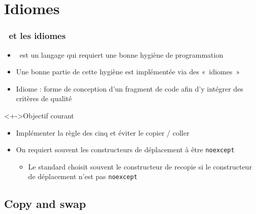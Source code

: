 \section{Idiomes}

\begin{frame}
\frametitle{\cpp\ et les idiomes}
\begin{itemize}[<+->]
\item \cpp\ est un langage qui requiert une bonne hygiène de programmation
\item Une bonne partie de cette hygiène est implémentée via des «~idiomes~»
\item Idiome : forme de conception d'un fragment de code afin d'y intégrer des critères de qualité
\end{itemize}
\begin{exampleblock}<+->{Objectif courant}
	\begin{itemize}[<+->]
	\item Implémenter la règle des cinq et éviter le copier / coller
	\end{itemize}
\end{exampleblock}
\begin{itemize}[<+->]
\item On requiert souvent les constructeurs de déplacement à être \lstinline|noexcept|
	\begin{itemize}
	\item Le standard choisit souvent le constructeur de recopie si le constructeur de déplacement n'est pas \lstinline|noexcept|
	\end{itemize}
\end{itemize}
\end{frame}

\subsection{Copy and swap}

